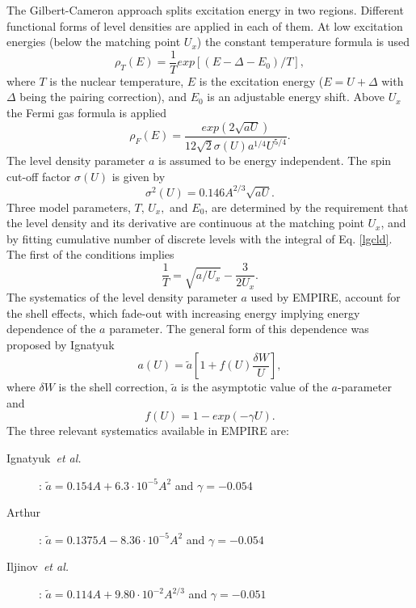The Gilbert-Cameron approach \cite{gc} splits excitation energy in two
regions. Different functional forms of level densities%
 are applied in each of them. At low excitation
energies (below the matching point $U_{x}$) the constant temperature formula
is used 
\begin{equation}
\rho_{T}(E)=%
\frac{1}{T}exp\left[(E-\Delta-E_{0})/T\right],  \label{lgcld}
\end{equation}
\noindent where $T$ is the nuclear temperature, $E$ is the excitation energy
($E=U+\Delta$ with $\Delta$ being the pairing correction), and $E_{0}$ is an
adjustable energy shift. Above $U_{x}$ the Fermi gas formula is applied 
\begin{equation}
\rho_{F}(E)=\frac{exp(2\sqrt{aU})}{12\sqrt{2}\sigma(U)a^{1/4}U^{5/4}}.
\label{ferld}
\end{equation}
The level density parameter $a$ is assumed to be energy independent. The
spin cut-off factor $\sigma(U)$ is given by 
\begin{equation}
\sigma^{2}(U)=0.146A^{2/3}\sqrt{aU}.  \label{sigld}
\end{equation}
Three model parameters, $T,\, U_{x},$ and $E_{0}$, are determined by the
requirement that the level density and its derivative are continuous at the
matching point $U_{x}$, and by fitting cumulative number of discrete levels
with the integral of Eq. \ref{lgcld}. The first of the conditions implies 
\begin{equation}
\frac{1}{T}=\sqrt{a/U_{x}}-\frac{3}{2U_{x}}.  \label{condUT}
\end{equation}
The systematics of the level density parameter $a$ used by EMPIRE, account
for the shell effects, which fade-out with increasing energy implying energy
dependence of the $a$ parameter. The general form of this dependence was
proposed by Ignatyuk~\cite{ignaa} 
\begin{equation}
a(U)=\widetilde{a}[1+f(U)\frac{\delta W}{U}],  \label{apiccoloGC}
\end{equation}
\noindent where $\delta W$ is the shell correction, $\widetilde{a}$ is the
asymptotic value of the $a$-parameter and 
\begin{equation}
f(U)=1-exp(-\gamma U).  \label{shellGC}
\end{equation}
The three relevant systematics available in EMPIRE are:

\begin{description}
\item[Ignatyuk~\emph{et al.}~\protect\cite{ignaa}] : $\widetilde{a}%
=0.154A+6.3\cdot10^{-5}A^{2}$ and $\gamma=-0.054$

\item[Arthur~\protect\cite{arthura}] : $\widetilde{a}=0.1375A-8.36%
\cdot10^{-5}A^{2}$ and $\gamma=-0.054$

\item[Iljinov~\emph{et al.}~\protect\cite{Mebel}] : $\widetilde{a}%
=0.114A+9.80\cdot10^{-2}A^{2/3}$ and $\gamma=-0.051$
\end{description}

